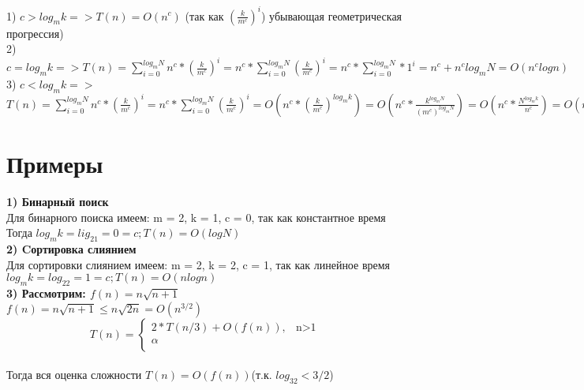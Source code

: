 \documentclass[a4paper,12pt]{article}
\begin{document}
1) $c>log_mk => T(n) = O(n^c)$ (так как $(\frac{k}{m^c})^i$) убывающая геометрическая прогрессия)\\

2) $c=log_mk => T(n) = \sum_{i=0}^{log_mN}n^c*(\frac{k}{m^c})^i=n^c*\sum_{i=0}^{log_mN}(\frac{k}{m^c})^i = n^c*\sum_{i=0}^{log_mN}*1^i = n^c+n^clog_mN = O(n^clogn)$\\

3) $c<log_mk=>$\\
$T(n) = \sum_{i=0}^{log_mN}n^c*(\frac{k}{m^c})^i =n^c*\sum_{i=0}^{log_mN}(\frac{k}{m^c})^i = O(n^c*(\frac{k}{m^c})^{log_mk}) = O(n^c*\frac{k^{log_mN}}{(m^c)^{log_mN}}) = O(n^c*\frac{N^{log_mk}}{n^c}) = O(n^{log_mk})$\\


\section{Примеры}
\noindent\textbf{1) Бинарный поиск}\\
Для бинарного поиска имеем: m = 2, k = 1, c = 0, так как константное время\\
Тогда $log_mk = lig_21 = 0 = c; T(n) = O(logN)$\\
\textbf{2) Cортировка слиянием}\\
Для сортировки слиянием имеем:  m = 2, k = 2, c = 1,  так как линейное время\\
$log_mk = log_22 = 1 = c; T(n) = O(nlogn)$\\
\textbf{3) Рассмотрим: $f(n) = n\sqrt{n+1}$}\\
$f(n) = n\sqrt{n+1}\leq n\sqrt{2n} = O(n^{3/2})$\\
\begin{displaymath}
T(n) = \left\{ \begin{array}{ll}
 2*T(n/3)+O(f(n)), & \textrm{n>1}\\
 \alpha & \textrm{}\\
  \end{array} \right.
\end{displaymath}\\
Тогда вся оценка сложности $T(n) = O(f(n))$(т.к. $log_32<3/2$)\\
\end{document}
